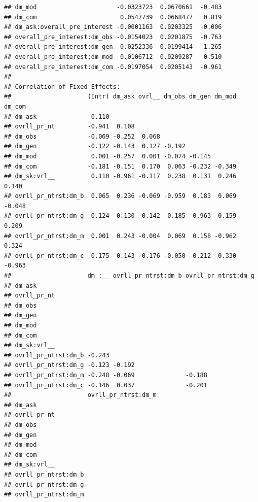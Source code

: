 \documentclass[]{msu-thesis}
\theoremstyle{definition}
\theoremstyle{definition}
\theoremstyle{definition}
\theoremstyle{remark}
\begin{document}
\begin{verbatim}
## dm_mod                      -0.0323723  0.0670661  -0.483
## dm_com                       0.0547739  0.0668477   0.819
## dm_ask:overall_pre_interest -0.0001163  0.0203325  -0.006
## overall_pre_interest:dm_obs -0.0154023  0.0201875  -0.763
## overall_pre_interest:dm_gen  0.0252336  0.0199414   1.265
## overall_pre_interest:dm_mod  0.0106712  0.0209287   0.510
## overall_pre_interest:dm_com -0.0197054  0.0205143  -0.961
## 
## Correlation of Fixed Effects:
##                     (Intr) dm_ask ovrl__ dm_obs dm_gen dm_mod dm_com
## dm_ask              -0.110                                          
## ovrll_pr_nt         -0.941  0.108                                   
## dm_obs              -0.069 -0.252  0.068                            
## dm_gen              -0.122 -0.143  0.127 -0.192                     
## dm_mod               0.001 -0.257  0.001 -0.074 -0.145              
## dm_com              -0.181 -0.151  0.170  0.063 -0.232 -0.349       
## dm_sk:vrl__          0.110 -0.961 -0.117  0.238  0.131  0.246  0.140
## ovrll_pr_ntrst:dm_b  0.065  0.236 -0.069 -0.959  0.183  0.069 -0.048
## ovrll_pr_ntrst:dm_g  0.124  0.130 -0.142  0.185 -0.963  0.159  0.209
## ovrll_pr_ntrst:dm_m  0.001  0.243 -0.004  0.069  0.158 -0.962  0.324
## ovrll_pr_ntrst:dm_c  0.175  0.143 -0.176 -0.050  0.212  0.330 -0.963
##                     dm_:__ ovrll_pr_ntrst:dm_b ovrll_pr_ntrst:dm_g
## dm_ask                                                            
## ovrll_pr_nt                                                       
## dm_obs                                                            
## dm_gen                                                            
## dm_mod                                                            
## dm_com                                                            
## dm_sk:vrl__                                                       
## ovrll_pr_ntrst:dm_b -0.243                                        
## ovrll_pr_ntrst:dm_g -0.123 -0.192                                 
## ovrll_pr_ntrst:dm_m -0.248 -0.069              -0.188             
## ovrll_pr_ntrst:dm_c -0.146  0.037              -0.201             
##                     ovrll_pr_ntrst:dm_m
## dm_ask                                 
## ovrll_pr_nt                            
## dm_obs                                 
## dm_gen                                 
## dm_mod                                 
## dm_com                                 
## dm_sk:vrl__                            
## ovrll_pr_ntrst:dm_b                    
## ovrll_pr_ntrst:dm_g                    
## ovrll_pr_ntrst:dm_m                    

\end{verbatim}
\end{document}
